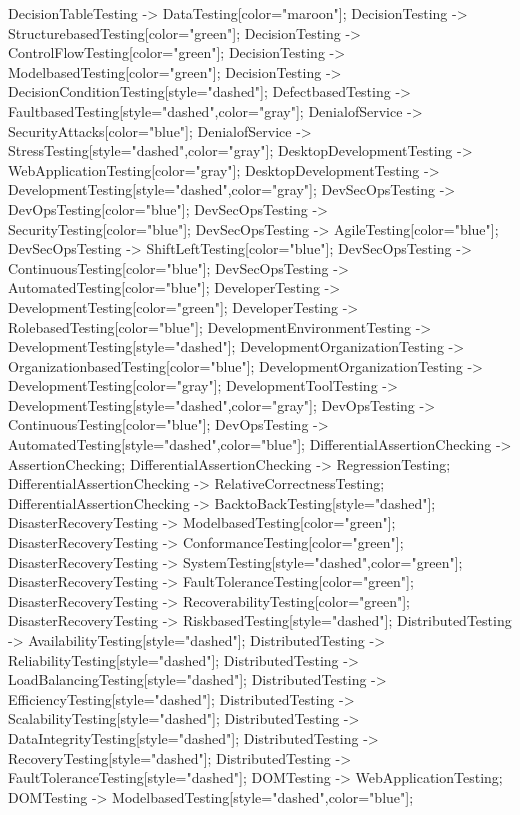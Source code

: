 \documentclass{article}
\begin{document}
{DecisionTableTesting -> DataTesting[color="maroon"];
DecisionTesting -> StructurebasedTesting[color="green"];
DecisionTesting -> ControlFlowTesting[color="green"];
DecisionTesting -> ModelbasedTesting[color="green"];
DecisionTesting -> DecisionConditionTesting[style="dashed"];
DefectbasedTesting -> FaultbasedTesting[style="dashed",color="gray"];
DenialofService -> SecurityAttacks[color="blue"];
DenialofService -> StressTesting[style="dashed",color="gray"];
DesktopDevelopmentTesting -> WebApplicationTesting[color="gray"];
DesktopDevelopmentTesting -> DevelopmentTesting[style="dashed",color="gray"];
DevSecOpsTesting -> DevOpsTesting[color="blue"];
DevSecOpsTesting -> SecurityTesting[color="blue"];
DevSecOpsTesting -> AgileTesting[color="blue"];
DevSecOpsTesting -> ShiftLeftTesting[color="blue"];
DevSecOpsTesting -> ContinuousTesting[color="blue"];
DevSecOpsTesting -> AutomatedTesting[color="blue"];
DeveloperTesting -> DevelopmentTesting[color="green"];
DeveloperTesting -> RolebasedTesting[color="blue"];
DevelopmentEnvironmentTesting -> DevelopmentTesting[style="dashed"];
DevelopmentOrganizationTesting -> OrganizationbasedTesting[color="blue"];
DevelopmentOrganizationTesting -> DevelopmentTesting[color="gray"];
DevelopmentToolTesting -> DevelopmentTesting[style="dashed",color="gray"];
DevOpsTesting -> ContinuousTesting[color="blue"];
DevOpsTesting -> AutomatedTesting[style="dashed",color="blue"];
DifferentialAssertionChecking -> AssertionChecking;
DifferentialAssertionChecking -> RegressionTesting;
DifferentialAssertionChecking -> RelativeCorrectnessTesting;
DifferentialAssertionChecking -> BacktoBackTesting[style="dashed"];
DisasterRecoveryTesting -> ModelbasedTesting[color="green"];
DisasterRecoveryTesting -> ConformanceTesting[color="green"];
DisasterRecoveryTesting -> SystemTesting[style="dashed",color="green"];
DisasterRecoveryTesting -> FaultToleranceTesting[color="green"];
DisasterRecoveryTesting -> RecoverabilityTesting[color="green"];
DisasterRecoveryTesting -> RiskbasedTesting[style="dashed"];
DistributedTesting -> AvailabilityTesting[style="dashed"];
DistributedTesting -> ReliabilityTesting[style="dashed"];
DistributedTesting -> LoadBalancingTesting[style="dashed"];
DistributedTesting -> EfficiencyTesting[style="dashed"];
DistributedTesting -> ScalabilityTesting[style="dashed"];
DistributedTesting -> DataIntegrityTesting[style="dashed"];
DistributedTesting -> RecoveryTesting[style="dashed"];
DistributedTesting -> FaultToleranceTesting[style="dashed"];
DOMTesting -> WebApplicationTesting;
DOMTesting -> ModelbasedTesting[style="dashed",color="blue"];
}
\end{document}
